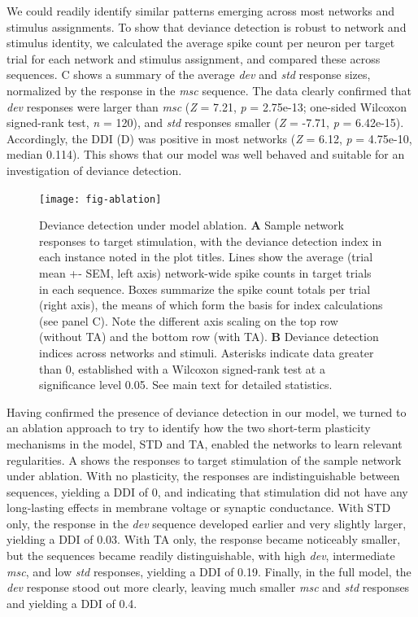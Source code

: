 \documentclass[9pt,lineno,onehalfspacing]{elife}
\newcommand{\dev}{\textit{dev}}
\newcommand{\msc}{\textit{msc}}
\newcommand{\std}{\textit{std}}
\begin{document}
We could readily identify similar patterns emerging across most networks and stimulus assignments. To show that deviance detection is robust to network and stimulus identity, we calculated the average spike count per neuron per target trial for each network and stimulus assignment, and compared these across sequences. C shows a summary of the average \dev{} and \std{} response sizes, normalized by the response in the \msc{} sequence. The data clearly confirmed that \dev{} responses were larger than \msc{} (\textit{Z} = 7.21, \textit{p} = 2.75e-13; one-sided Wilcoxon signed-rank test, \textit{n} = 120), and \std{} responses smaller (\textit{Z} = -7.71, \textit{p} = 6.42e-15). Accordingly, the DDI (D) was positive in most networks (\textit{Z} = 6.12, \textit{p} = 4.75e-10, median 0.114). This shows that our model was well behaved and suitable for an investigation of deviance detection.

\begin{figure}
    \texttt{[image: fig-ablation]}
    \caption{%
        Deviance detection under model ablation.
        \textbf{A} Sample network responses to target stimulation, with the deviance detection index in each instance noted in the plot titles. Lines show the average (trial mean +- SEM, left axis) network-wide spike counts in target trials in each sequence. Boxes summarize the spike count totals per trial (right axis), the means of which form the basis for index calculations (see panel C). Note the different axis scaling on the top row (without TA) and the bottom row (with TA).
        \textbf{B} Deviance detection indices across networks and stimuli. Asterisks indicate data greater than 0, established with a Wilcoxon signed-rank test at a significance level 0.05. See main text for detailed statistics.
    }
    \label{fig:ablation}
\end{figure}

Having confirmed the presence of deviance detection in our model, we turned to an ablation approach to try to identify how the two short-term plasticity mechanisms in the model, STD and TA, enabled the networks to learn relevant regularities. A shows the responses to target stimulation of the sample network under ablation. With no plasticity, the responses are indistinguishable between sequences, yielding a DDI of 0, and indicating that stimulation did not have any long-lasting effects in membrane voltage or synaptic conductance. With STD only, the response in the \dev{} sequence developed earlier and very slightly larger, yielding a DDI of 0.03. With TA only, the response became noticeably smaller, but the sequences became readily distinguishable, with high \dev{}, intermediate \msc{}, and low \std{} responses, yielding a DDI of 0.19. Finally, in the full model, the \dev{} response stood out more clearly, leaving much smaller \msc{} and \std{} responses and yielding a DDI of 0.4.
\end{document}
